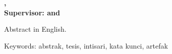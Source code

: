 \newpage
{}
\vspace{10mm}
\normalsize
\justifying

\noindent
\textbf{\pnama, \ptitleen}
\textbf{
  \noindent
  \\Supervisor: \ppembimbingsatu
  \ifthenelse{\equal{\ppembimbingdua}{}}
  {} {\phantom{ }and \ppembimbingdua}
}

\vspace{5mm}

\indent
Abstract in English.

\vspace{5mm}
\noindent
Keywords: abstrak, tesis, intisari, kata kunci, artefak
